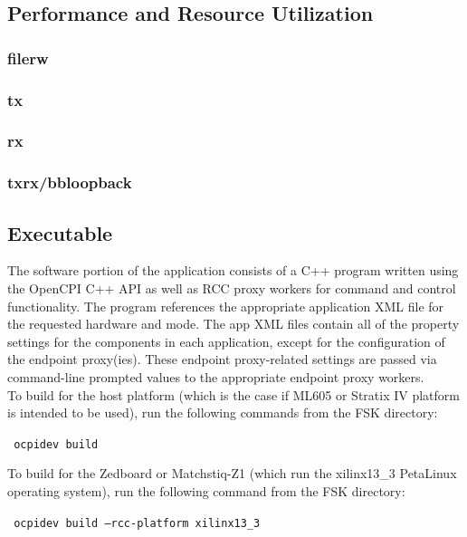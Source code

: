	\newpage
\begin{landscape}
\subsection{Performance and Resource Utilization}
\subsubsection{filerw}
%
\subsubsection{tx}
%
\subsubsection{rx}
%
\subsubsection{txrx/bbloopback}
%
\end{landscape}
\subsection{Executable}
The software portion of the application consists of a C++ program written using the OpenCPI C++ API as well as RCC proxy workers for command and control functionality. The program references the appropriate application XML file for the requested hardware and mode. The app XML files contain all of the property settings for the components in each application, except for the configuration of the endpoint proxy(ies). These endpoint proxy-related settings are passed via command-line prompted values to the appropriate endpoint proxy workers.\\
To build for the host platform (which is the case if ML605 or Stratix IV platform is intended to be used), run the following commands from the FSK directory:\par\medskip
\texttt{ ocpidev build}\par\medskip
\noindent To build for the Zedboard or Matchstiq-Z1 (which run the xilinx13\_3 PetaLinux operating system), run the following command from the FSK directory:\par\medskip
\texttt{ ocpidev build --rcc-platform xilinx13\_3 }\par\medskip

